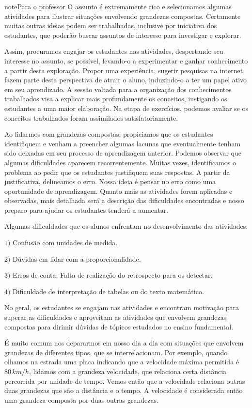 \begin{sphinxadmonition}{note}{Para o professor}
O assunto é extremamente rico e selecionamos algumas atividades para ilustrar situações envolvendo grandezas compostas. Certamente muitas outras ideias podem ser trabalhadas, inclusive por iniciativa dos estudantes, que poderão buscar assuntos de interesse para investigar e explorar.

Assim, procuramos engajar os estudantes nas atividades, despertando seu interesse no assunto, se possível, levando-o a experimentar e ganhar conhecimento a partir desta exploração. Propor uma experiência, sugerir pesquisas na internet, fazem parte desta perspectiva de atrair o aluno, induzindo-o a ter um papel ativo em seu aprendizado.  A sessão voltada para a organização dos conhecimentos trabalhados visa a explicar mais profundamente os conceitos, instigando os estudantes a uma maior elaboração. Na etapa de exercícios, podemos avaliar se os conceitos trabalhados foram assimilados satisfatoriamente.

Ao lidarmos com grandezas compostas, propiciamos que os estudantes identifiquem e venham a preencher algumas lacunas que eventualmente tenham sido deixadas em seu processo de aprendizagem anterior. Podemos observar que algumas dificuldades aparecem recorrentemente. Muitas vezes, identificamos o problema ao pedir que os estudantes justifiquem suas respostas. A partir da justificativa, delineamos o erro. Nossa ideia é pensar no erro como uma oportunidade de aprendizagem. Quanto mais as atividades forem aplicadas e observadas, mais detalhada será a descrição das dificuldades encontradas e nosso preparo para ajudar os estudantes tenderá a aumentar.

Algumas dificuldades que os alunos enfrentam no desenvolvimento das atividades:

\(1)\) Confusão com unidades de medida.

\(2)\) Dúvidas em lidar com a proporcionalidade.

\(3)\) Erros de conta. Falta de realização do retrospecto para os detectar.

\(4)\) Dificuldade de interpretação de tabelas ou do texto matemático.

No geral, os estudantes se engajam nas atividades e encontram motivação para superar as dificuldades e aproveitam as atividades que envolvem grandezas compostas para  dirimir dúvidas de tópicos estudados no ensino fundamental.
\end{sphinxadmonition}

É muito comum nos depararmos em nosso dia a dia com situações que envolvem grandezas de diferentes tipos, que se interrelacionam. Por exemplo, quando olhamos na estrada uma placa indicando que a velocidade máxima permitida é \(80\,km/h\), lidamos com a grandeza velocidade, que relaciona certa distância percorrida por unidade de tempo. Vemos então que a  velocidade relaciona outras duas  grandezas que são a distância e o tempo. A velocidade é considerada então uma grandeza composta por duas outras grandezas.

